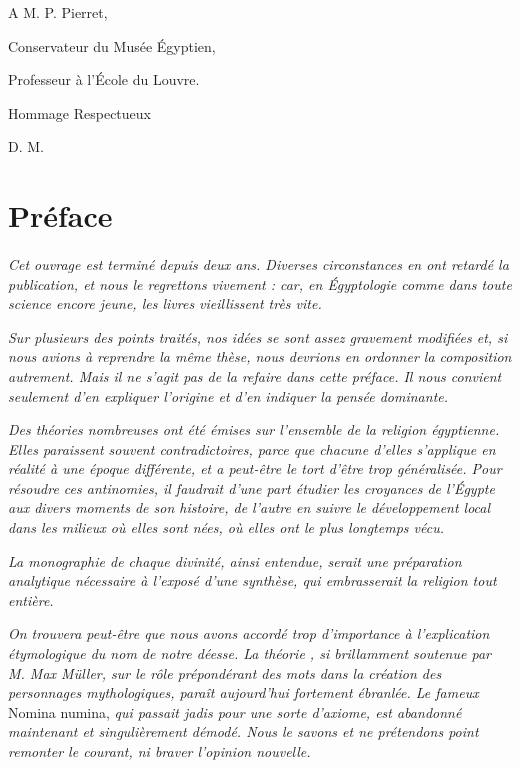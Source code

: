 \documentclass[a4paper, 11pt, oneside]{article}
\begin{document}
\setlength{\parskip}{1mm plus1mm minus1mm}
\clearpage
\tableofcontents
\clearpage
\large
\vspace*{\fill}
A M. P. Pierret,

Conservateur du Musée Égyptien,

Professeur à l'École du Louvre.

Hommage Respectueux

D. M.
\vspace*{\fill}
\clearpage
\section*{Préface}
\paragraph{}
\emph{Cet ouvrage est terminé depuis deux ans. Diverses circonstances en ont retardé la publication, et nous le regrettons vivement : car, en Égyptologie comme dans toute science encore jeune, les livres vieillissent très vite.}

\emph{Sur plusieurs des points traités, nos idées se sont assez gravement modifiées et, si nous avions à reprendre la même thèse, nous devrions en ordonner la composition autrement. Mais il ne s'agit pas de la refaire dans cette préface. Il nous convient seulement d'en expliquer l'origine et d'en indiquer la pensée dominante.}

\emph{Des théories nombreuses ont été émises sur l'ensemble de la religion égyptienne. Elles paraissent souvent contradictoires, parce que chacune d'elles s'applique en réalité à une époque différente, et a peut-être le tort d'être trop généralisée. Pour résoudre ces antinomies, il faudrait d'une part étudier les croyances de l'Égypte aux divers moments de son histoire, de l'autre en suivre le développement local dans les milieux où elles sont nées, où elles ont le plus longtemps vécu.}

\emph{La monographie de chaque divinité, ainsi entendue, serait une préparation analytique nécessaire à l'exposé d'une synthèse, qui embrasserait la religion tout entière.}

\emph{On trouvera peut-être que nous avons accordé trop d'importance à l'explication étymologique du nom de notre déesse. La théorie , si brillamment soutenue par M. Max Müller, sur le rôle prépondérant des mots dans la création des personnages mythologiques, paraît aujourd'hui fortement ébranlée. Le fameux} Nomina numina, \emph{qui passait jadis pour une sorte d'axiome, est abandonné maintenant et singulièrement démodé. Nous le savons et ne prétendons point remonter le courant, ni braver l'opinion nouvelle.}
\end{document}
